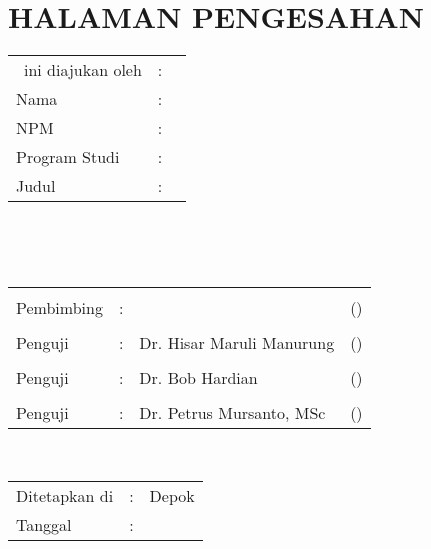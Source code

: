 %
%
%

\chapter*{HALAMAN PENGESAHAN}

\vspace*{0.4cm}
\noindent 

\noindent
\begin{tabular}{ll p{9cm}}
	\type~ini diajukan oleh&: & \\
	Nama&: & \penulis \\
	NPM&: & \npm \\
	Program Studi&: & \programstudi \\
	Judul \type&: & \judul \\
\end{tabular} \\

\vspace*{1.0cm}

\noindent {}\\[0.2cm]

\begin{center}
\end{center}

\vspace*{0.3cm}

\begin{tabular}{l l l l }
	& & & \\
	Pembimbing&: 	& \pembimbing & (\hspace*{3.0cm}) \\
	& & & \\
	Penguji&: 		&   Dr. Hisar Maruli Manurung 	&  (\hspace*{3.0cm}) \\
	& & & \\
	Penguji&: 		&   Dr. Bob Hardian	&  (\hspace*{3.0cm}) \\
	& & & \\
	Penguji&: 		&  	Dr. Petrus Mursanto, MSc &  (\hspace*{3.0cm}) \\
\end{tabular}\\


\vspace*{2.0cm}

\begin{tabular}{ll l}
	Ditetapkan di&: & Depok\\
	Tanggal&: & \tanggalLulus \\
\end{tabular}


\newpage